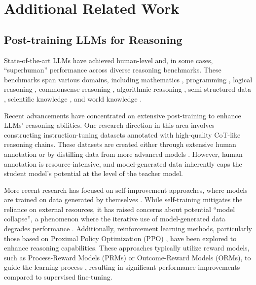 \section{Additional Related Work} \label{sec:related}
\subsection{Post-training LLMs for Reasoning}

State-of-the-art LLMs have achieved human-level and, in some cases, ``superhuman'' performance across diverse reasoning benchmarks. These benchmarks span various domains, including mathematics \cite{GSM8K, MATH, frontiermath, gsmsymbol}, programming \cite{humaneval, mbpp, bigcodebench, mhpp, swebench, cruxeval}, logical reasoning \cite{folio, logiqa, fimo, proofwriter}, commonsense reasoning \cite{strategyqa, commonsenseqa}, algorithmic reasoning \cite{clrs, clrstext, scylla, nphardeval}, semi-structured data \cite{tablebench, tabmwp}, scientific knowledge \cite{scibench, gpqa}, and world knowledge \cite{mmlu, mmlupro, bigbench, liang2022holistic, hle}. 

Recent advancements have concentrated on extensive post-training to enhance LLMs' reasoning abilities. One research direction in this area involves constructing instruction-tuning datasets annotated with high-quality CoT-like reasoning chains. These datasets are created either through extensive human annotation \cite{MATH, Selfcritiquing, mammoth} or by distilling data from more advanced models \cite{metamath, openmathinstruct, openmathinstruct2, scalequest, wizardmath, o1journey2, marcoo1, phi4, min2024imitate}. However, human annotation is resource-intensive, and model-generated data inherently caps the student model's potential at the level of the teacher model.

More recent research has focused on self-improvement approaches, where models are trained on data generated by themselves \cite{star, quietstar, singh2023beyond, cpo}. While self-training mitigates the reliance on external resources, it has raised concerns about potential ``model collapse'', a phenomenon where the iterative use of model-generated data degrades performance \cite{curseofrecursion, progressofregress}.
Additionally, reinforcement learning methods, particularly those based on Proximal Policy Optimization (PPO) \cite{ppo, rlhf}, have been explored to enhance reasoning capabilities. These approaches typically utilize reward models, such as Process-Reward Models (PRMs) or Outcome-Reward Models (ORMs), to guide the learning process \cite{easytohard, mathshepherd, yuan2024implicitprm}, resulting in significant performance improvements compared to supervised fine-tuning.

